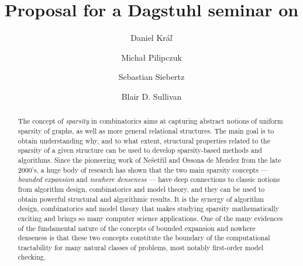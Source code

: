 \documentclass[10pt]{article}
\title{{\large{Proposal for a Dagstuhl seminar on}}\\
  {\LARGE{\textbf{\ourtitle}}}}
\author{
  Daniel Kr\'a\v{l} \and
  Micha\l{} Pilipczuk \and
  Sebastian Siebertz\and
  Blair D. Sullivan 
}
\date{}
\begin{document}
\maketitle

\begin{abstract}
The concept of \emph{sparsity} in combinatorics
aims at capturing abstract notions of uniform sparsity of graphs,
as well as more general relational structures.
The main goal is to obtain understanding why, and to what extent,
structural properties related to the sparsity of a given structure
can be used to develop sparsity-based methods and algorithms.
Since the pioneering work of Ne\v{s}et\v{r}il and Ossona de Mendez from the late 2000's,
a huge body of research has shown that the two main sparsity concepts --- \emph{bounded expansion} and \emph{nowhere denseness} ---
have deep connections to classic notions from algorithm design, combinatorics and model theory, and
they can be used to obtain powerful structural and algorithmic results.
It is the synergy of algorithm design, combinatorics and model theory that
makes studying sparsity mathematically exciting and brings so many computer science applications.
One of the many evidences of the fundamental nature of the concepts of bounded expansion and nowhere denseness is that
these two concepts constitute the boundary of the computational tractability for many natural classes of problems, 
most notably first-order model checking.


\end{abstract}
\end{document}
